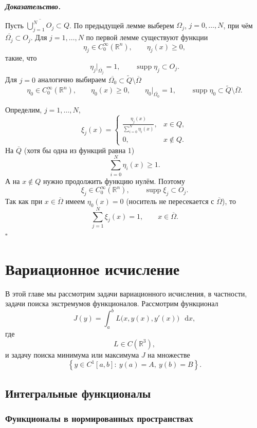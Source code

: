\documentclass[11pt,a4paper]{report}
\numberwithin{equation}{section}
\numberwithin{figure}{chapter}
\numberwithin{table}{chapter}
\newenvironment{myproof}{%
    \begin{tcolorbox}[mathphysblock,colframe=proofcolor!65,colback=proofcolor!2,boxrule=0.5pt]
    \textit{\textbf{Доказательство.}}\par\smallskip
}{%
    \hfill$\square$
    \end{tcolorbox}
}
\newcommand{\dd}{\mathop{}\!\mathrm{d}}
\begin{document}
\begin{myproof}
Пусть $\overline{\bigcup_{j=1}^{N}O_j}\subset Q$.
По предыдущей лемме выберем $\Omega_j$, $j=0,\ldots,N$, при чём $\overline{\Omega_j}\subset O_j$.
Для $j=1,\ldots,N$ по первой лемме существуют функции
\[
\eta_j\in C_0^\infty(\mathbb R^n),
\qquad
\eta_j(x)\ge0,
\]
такие, что
\[
\eta_j\big|_{\overline{\Omega_j}}=1,
\qquad
\operatorname{supp}\eta_j\subset O_j.
\]
Для $j=0$ аналогично выбираем $\overline{\Omega_0}\subset\widetilde{Q}\setminus\overline{\Omega}$
\[
\eta_0\in C_0^\infty(\mathbb R^n),
\qquad
\eta_0(x)\ge0,
\qquad
\eta_0\big|_{\overline{\Omega_0}}=1,
\qquad
\operatorname{supp}\eta_0\subset\widetilde Q\setminus\overline\Omega.
\]

Определим, $j=1,\ldots,N$,
\[
\xi_j(x)=
\begin{cases}
\displaystyle
\frac{\eta_j(x)}{\sum\limits_{i=0}^{N}\eta_i(x)}, & x\in Q,\\[4mm]
0, & x\notin Q.
\end{cases}
\]
На $\overline Q$ (хотя бы одна из функций равна 1)
\[
\sum_{i=0}^{N}\eta_i(x)\ge1.
\]
А на $x\notin Q$ нужно продолжить функцию нулём.
Поэтому
\[
\xi_j\in C_0^\infty(\mathbb R^n),
\qquad
\operatorname{supp}\xi_j\subset O_j.
\]
Так как при $x\in\overline\Omega$ имеем $\eta_0(x)=0$ (носитель не пересекается с $\overline{\Omega}$), то
\[
\sum_{j=1}^{N}\xi_j(x)=1,
\qquad x\in\overline\Omega.
\]
\end{myproof}


\chapter{Вариационное исчисление}
В этой главе мы рассмотрим задачи вариационного исчисления, в частности, задачи поиска экстремумов функционалов.
Рассмотрим функционал
\[
J(y)=\int_a^b L\bigl(x,y(x),y'(x)\bigr)\,\dd x,
\]
где
\[
L\in C(\mathbb R^3),
\]
и задачу поиска минимума или максимума $J$ на множестве
\[
\left\{y\in C^1[a,b]:\ y(a)=A,\ y(b)=B\right\}.
\]

\section{Интегральные функционалы}

\subsection{Функционалы в нормированных пространствах}
\end{document}
